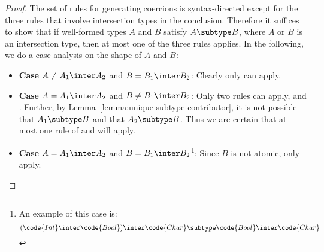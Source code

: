 \begin{proof}
The set of rules for generating coercions is syntax-directed except for the three rules that involve intersection types in the conclusion. Therefore it suffices to show that if well-formed types $A$ and $B$ satisfy $A \subtype B$, where $A$ or $B$ is an intersection type, then at most one of the three rules applies. In the following, we do a case analysis on the shape of $A$ and $B$:

\begin{itemize}
  \item \textbf{Case} $A \neq A_1 \inter A_2$ and $B = B_1 \inter B_2$: Clearly only  can apply.

  \item \textbf{Case} $A = A_1 \inter A_2$ and $B \neq B_1 \inter B_2$: Only two rules can apply,  and . Further, by Lemma~\ref{lemma:unique-subtype-contributor}, it is not possible that $A_1 \subtype B$ and that $A_2 \subtype B$. Thus we are certain that at most one rule of  and  will apply.

  \item \textbf{Case} $A = A_1 \inter A_2$ and $B = B_1 \inter B_2$\footnote{An example of this case is:
    \[ (\code{Int} \inter \code{Bool}) \inter \code{Char} \subtype \code{Bool} \inter \code{Char} \]}: Since $B$ is not atomic, only  apply.

\end{itemize}
\end{proof}

